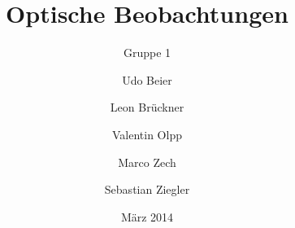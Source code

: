 
%
%


\title{Optische Beobachtungen}
\subtitle{Gruppe 1}
\date{März 2014}
\author{Udo Beier \and Leon Brückner \and Valentin Olpp \and Marco Zech \and Sebastian Ziegler}
\maketitle
\tableofcontents
\newpage
\listoffigures
\listoftables
\newpage



\newpage
%
%



